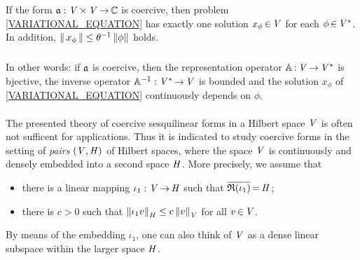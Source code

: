 \documentclass[11pt,twoside]{article}
\begin{document}
\begin{theorem}\label{LAX-MILGRAM_THEOREM}
If the form $\mathfrak{a}:\mathit{V} {\,\times\,} \mathit{V} {\,\to\,} {\mathbb{C}}$ is coercive,
then problem \eqref{VARIATIONAL_EQUATION} has exactly
one solution $x_{\phi} {\,\in\,} \mathit{V}$ for each $\phi {\,\in\,} \mathit{V}^*$.
In addition,
$\left\lVert \,x_{\phi}\, \right\rVert \leq \theta^{-1} \left\lVert \phi \right\rVert$ holds.
\end{theorem}

\subparagraph*{}
In other words:
if $\mathfrak{a}$ is coercive,
then the representation operator
$\mathbb{A} {\,:\,} \mathit{V} {\,\to\,} \mathit{V}^*$ is bjective,
the inverse operator $\mathbb{A}^{-1}:\mathit{V}^* {\,\to\,} \mathit{V}$ is bounded
and the solution $x_{\phi}$ of \eqref{VARIATIONAL_EQUATION}
continuously depends on $\phi$.

\paragraph*{} %
The presented theory of coercive sesquilinear forms in a Hilbert space $\mathit{V}$
is often not sufficent for applications.
Thus it is indicated to study coercive forms in the setting of
\textit{pairs} $(\mathit{V},\mathit{H})$ of Hilbert spaces,
where the space $\mathit{V}$ is continuously and densely embedded
into a second space $\mathit{H}$.
More precisely,
we assume that

\begin{itemize}[leftmargin=40pt]
\item[(T-1)]
there is a linear mapping $\iota_1:\mathit{V} {\,\to\,} \mathit{H}$
such that $\overline{\mathfrak{R}(\iota_1) } {\,=\,} \mathit{H}$;

\item[(T-2)]
there is $c>0$ such that
$\left\lVert \iota_1 v \right\rVert_{\mathit{H}} \leq c \left\lVert v \right\rVert_{\mathit{V}}$ for all $v {\,\in\,} \mathit{V}$.
\end{itemize}
By means of the embedding $\iota_1$,
one can also think of $\mathit{V}$ as a dense linear subspace
within the larger space $\mathit{H}$.
\end{document}

